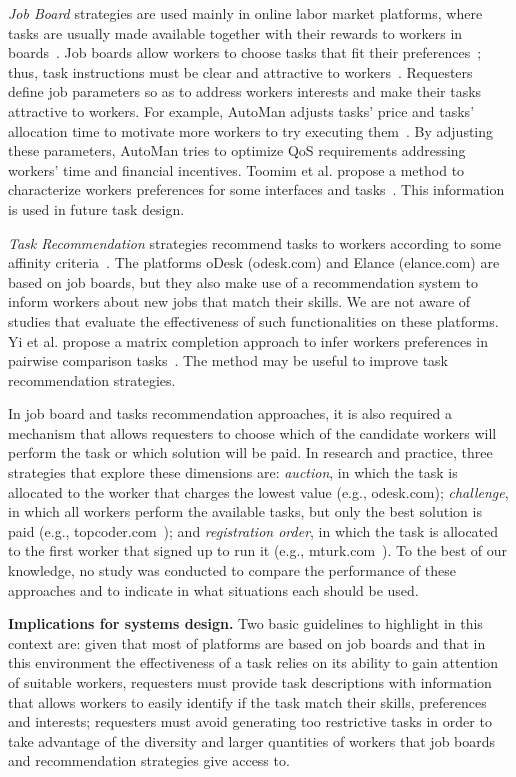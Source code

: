 \documentclass[11pt]{bmc_article_s50}
\begin{document}
\textit{Job Board} strategies are used mainly in online labor market platforms, where tasks are usually made available together with their rewards to workers in boards~\cite{Chilton:HCOMP:2010}. {\color{black}Job boards allow workers to choose tasks that fit their preferences~\cite{Lee:2013}; thus, task instructions must be clear and attractive to workers~\cite{Jason:2013}}. Requesters define job parameters so as to address workers interests and make their tasks attractive to workers. For example, AutoMan adjusts tasks' price and tasks' allocation time to motivate more workers to try executing them~\cite{Barowy:2012}. By adjusting these parameters, AutoMan tries to optimize QoS requirements addressing workers' time and financial incentives. Toomim et al. propose a method to characterize workers preferences for some interfaces and tasks~\cite{Toomim:CHI:2011}. This information is used in future task design.

\textit{Task Recommendation} strategies recommend tasks to workers according to some affinity criteria~\cite{Ambati:HCOMP:2012}. The platforms oDesk (odesk.com) and Elance (elance.com) are based on job boards, but they also make use of a recommendation system to inform workers about new jobs that match their skills. We are not aware of studies that evaluate the effectiveness of such functionalities on these platforms. {\color{black}Yi et al. propose a matrix completion approach to infer workers preferences in pairwise comparison tasks~\cite{Yi:2013}. The method may be useful to improve task recommendation strategies.}

In job board and tasks recommendation approaches, it is also required a mechanism that allows requesters to choose which of the candidate workers will perform the task or which solution will be paid. In research and practice, three strategies that explore these dimensions are: \textit{auction}, in which the task is allocated to the worker that charges the lowest value (e.g., odesk.com); \textit{challenge}, in which all workers perform the available tasks, but only the best solution is paid (e.g., topcoder.com~\cite{Archak:2010}); and \textit{registration order}, in which the task is allocated to the first worker that signed up to run it (e.g., mturk.com~\cite{Chen:chiHcomp:2011}). To the best of our knowledge, no study was conducted to compare the performance of these approaches and to indicate in what situations each should be used.

\textbf{Implications for systems design.} Two basic guidelines to highlight in this context are:  given that most of platforms are based on job boards and that in this environment the effectiveness of a task relies on its ability to gain attention of suitable workers, requesters must provide task descriptions with information that allows workers to easily identify if the task match their skills, preferences and interests;  requesters must avoid generating too restrictive tasks in order to take advantage of the diversity and larger quantities of workers that job boards and recommendation strategies give access to.
\end{document}
